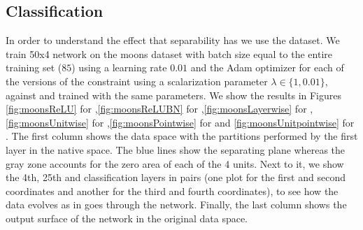 \subsection{Classification}\label{subsec:classification}


In order to understand the effect that separability has we use the \moons dataset. We train 50x4 network on the moons dataset with batch size equal to the entire training set ($85$) using a learning rate $0.01$ and the Adam optimizer \cite{adam} for each of the versions of the constraint using a scalarization parameter $\lambda \in \{1, 0.01\}$, against \ReLU and \ReLUBN trained with the same parameters. We show the results in Figures \ref{fig:moonsReLU} for \ReLU,\ref{fig:moonsReLUBN} for \ReLUBN,\ref{fig:moonsLayerwise} for \SepLayer,\ref{fig:moonsUnitwise} for \SepUnit,\ref{fig:moonsPointwise} for \SepPoint and \ref{fig:moonsUnitpointwise} for \SepUnitPoint. The first column shows the data space with the partitions performed by the first layer in the native space. The blue lines show the separating plane whereas the gray zone accounts for the zero area of each of the 4 units. Next to it, we show the 4th, 25th and classification layers in pairs (one plot for the first and second coordinates and another for the third and fourth coordinates), to see how the data evolves as in goes through the network. Finally, the last column shows the output surface of the network in the original data space. 

